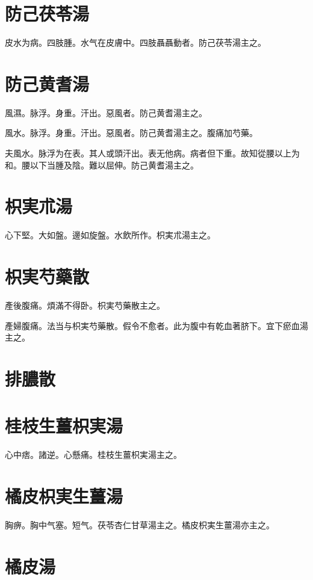 \documentclass[b5paper,twoside,zihao=-4,UTF8]{ctexbook}
\begin{document}
\section{防己茯苓湯}

皮水为病。四肢腫。水气在皮膚中。四肢聶聶動者。防己茯苓湯主之。

\section{防己黄耆湯}

風濕。脉浮。身重。汗出。惡風者。防己黄耆湯主之。

風水。脉浮。身重。汗出。惡風者。防己黄耆湯主之。腹痛加芍藥。

夫風水。脉浮为在表。其人或頭汗出。表无他病。病者但下重。故知從腰以上为和。腰以下当腫及陰。難以屈伸。防己黄耆湯主之。

\section{枳実朮湯}

心下堅。大如盤。邊如旋盤。水飲所作。枳{実}朮湯主之。

\section{枳実芍藥散}

產後腹痛。煩滿不得卧。枳実芍藥散主之。

產婦腹痛。法当与枳実芍藥散。假令不愈者。此为腹中有乾血著脐下。宜下瘀血湯主之。

\section{排膿散}

\section{桂枝生薑枳実湯}

心中痞。諸逆。心懸痛。桂枝生薑枳実湯主之。

\section{橘皮枳実生薑湯}

胸痹。胸中气塞。短气。茯苓杏仁甘草湯主之。橘{皮}枳{実生}薑湯亦主之。

\section{橘皮湯}
\end{document}
